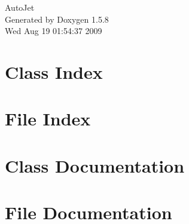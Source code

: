 \documentclass[a4paper]{book}
\begin{document}
\begin{titlepage}
\vspace*{7cm}
\begin{center}
{\Large AutoJet }\\
\vspace*{1cm}
{\large Generated by Doxygen 1.5.8}\\
\vspace*{0.5cm}
{\small Wed Aug 19 01:54:37 2009}\\
\end{center}
\end{titlepage}
\clearemptydoublepage
{}
\tableofcontents
\clearemptydoublepage
{}
\chapter{Class Index}

\chapter{File Index}

\chapter{Class Documentation}




\chapter{File Documentation}









\printindex
\end{document}

